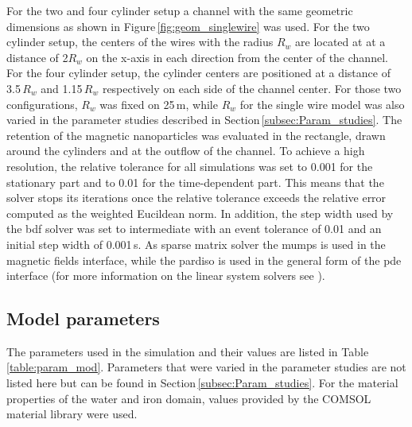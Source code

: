 For the two and four cylinder setup a channel with the same geometric dimensions as shown in Figure\,\ref{fig:geom_singlewire} was used. For the two cylinder setup, the centers of the wires with the radius $R_{w}$ are located at at a distance of 2$R_{w}$ on the x-axis in each direction from the center of the channel. For the four cylinder setup, the cylinder centers are positioned at a distance of 3.5\,$R_{w}$ and 1.15\,$R_{w}$ respectively on each side of the channel center. For those two configurations, $R_{w}$ was fixed on 25\,\textmu m, while $R_{w}$ for the single wire model was also varied in the parameter studies described in Section\,\ref{subsec:Param_studies}. The retention of the magnetic nanoparticles was evaluated in the rectangle, drawn around the cylinders and at the outflow of the channel. To achieve a high resolution, the relative tolerance for all simulations was set to 0.001 for the stationary part and to 0.01 for the time-dependent part. This means that the solver stops its iterations once the relative tolerance exceeds the relative error computed as the weighted Eucildean norm. In addition, the step width used by the \gls{bdf} solver was set to intermediate with an event tolerance of 0.01 and an initial step width of 0.001\,s. As sparse matrix solver the \gls{mumps} is used in the magnetic fields interface, while the \gls{pardiso} is used in the general form of the \gls{pde} interface (for more information on the linear system solvers see \cite{ComsolRefManual}).   

\newpage
\subsection{Model parameters}
\label{subsec:Cond_param}

The parameters used in the simulation and their values are listed in Table\,\ref{table:param_mod}. Parameters that were varied in the parameter studies are not listed here but can be found in Section\,\ref{subsec:Param_studies}. For the material properties of the water and iron domain, values provided by the COMSOL material library were used.   

